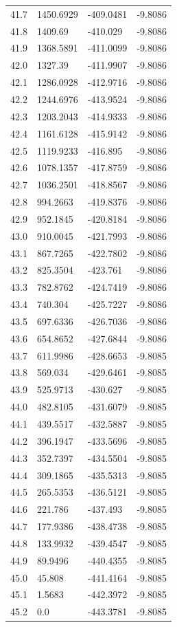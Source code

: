 \begin{table}[H]
\begin{tabular}{llll}
41.7 & 1450.6929 & -409.0481 & -9.8086 \\
41.8 & 1409.69 & -410.029 & -9.8086 \\
41.9 & 1368.5891 & -411.0099 & -9.8086 \\
42.0 & 1327.39 & -411.9907 & -9.8086 \\
42.1 & 1286.0928 & -412.9716 & -9.8086 \\
42.2 & 1244.6976 & -413.9524 & -9.8086 \\
42.3 & 1203.2043 & -414.9333 & -9.8086 \\
42.4 & 1161.6128 & -415.9142 & -9.8086 \\
42.5 & 1119.9233 & -416.895 & -9.8086 \\
42.6 & 1078.1357 & -417.8759 & -9.8086 \\
42.7 & 1036.2501 & -418.8567 & -9.8086 \\
42.8 & 994.2663 & -419.8376 & -9.8086 \\
42.9 & 952.1845 & -420.8184 & -9.8086 \\
43.0 & 910.0045 & -421.7993 & -9.8086 \\
43.1 & 867.7265 & -422.7802 & -9.8086 \\
43.2 & 825.3504 & -423.761 & -9.8086 \\
43.3 & 782.8762 & -424.7419 & -9.8086 \\
43.4 & 740.304 & -425.7227 & -9.8086 \\
43.5 & 697.6336 & -426.7036 & -9.8086 \\
43.6 & 654.8652 & -427.6844 & -9.8086 \\
43.7 & 611.9986 & -428.6653 & -9.8085 \\
43.8 & 569.034 & -429.6461 & -9.8085 \\
43.9 & 525.9713 & -430.627 & -9.8085 \\
44.0 & 482.8105 & -431.6079 & -9.8085 \\
44.1 & 439.5517 & -432.5887 & -9.8085 \\
44.2 & 396.1947 & -433.5696 & -9.8085 \\
44.3 & 352.7397 & -434.5504 & -9.8085 \\
44.4 & 309.1865 & -435.5313 & -9.8085 \\
44.5 & 265.5353 & -436.5121 & -9.8085 \\
44.6 & 221.786 & -437.493 & -9.8085 \\
44.7 & 177.9386 & -438.4738 & -9.8085 \\
44.8 & 133.9932 & -439.4547 & -9.8085 \\
44.9 & 89.9496 & -440.4355 & -9.8085 \\
45.0 & 45.808 & -441.4164 & -9.8085 \\
45.1 & 1.5683 & -442.3972 & -9.8085 \\
45.2 & 0.0 & -443.3781 & -9.8085 \\
\bottomrule
\end{tabular}

\end{table}
